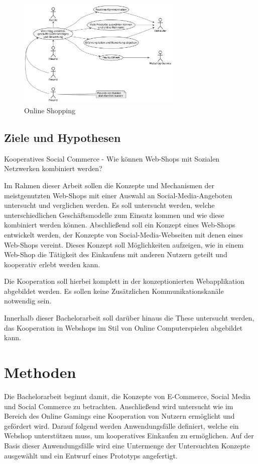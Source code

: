 \begin{figure}[htbp]
	\centering
	\includegraphics[width=0.7\textwidth]{uml-diagramme/online-shopping.png}
	\caption{Online Shopping}
	\label{fig:online-shopping}
\end{figure}


\subsection{Ziele und Hypothesen}

Kooperatives Social Commerce
- Wie können Web-Shops mit Sozialen Netzwerken kombiniert werden?

Im Rahmen dieser Arbeit sollen die Konzepte und Mechanismen der meistgenutzten Web-Shops mit einer Auswahl an Social-Media-Angeboten untersucht und verglichen werden. Es soll untersucht werden, welche unterschiedlichen Geschäftsmodelle zum Einsatz kommen und wie diese kombiniert werden können. Abschließend soll ein Konzept eines Web-Shops entwickelt werden, der Konzepte von Social-Media-Webseiten mit denen eines Web-Shops vereint. Dieses Konzept soll Möglichkeiten aufzeigen, wie in einem Web-Shop die Tätigkeit des Einkaufens mit anderen Nutzern geteilt und kooperativ erlebt werden kann.

Die Kooperation soll hierbei komplett in der konzeptionierten Webapplikation abgebildet werden. Es sollen keine Zusätzlichen Kommunikationskanäle notwendig sein.

Innerhalb dieser Bachelorarbeit soll darüber hinaus die These untersucht werden, das Kooperation in Webshops im Stil von Online Computerspielen abgebildet kann.


\section{Methoden}

Die Bachelorarbeit beginnt damit, die Konzepte von E-Commerce, Social Media und Social Commerce zu betrachten. Anschließend wird untersucht wie im Bereich des Online Gamings eine Kooperation von Nutzern ermöglicht und gefördert wird. Darauf folgend werden Anwendungsfälle definiert, welche ein Webshop unterstützen muss, um kooperatives Einkaufen zu ermöglichen. Auf der Basis dieser Anwendungsfälle wird eine Untermenge der Untersuchten Konzepte ausgewählt und ein Entwurf eines Prototyps angefertigt.

